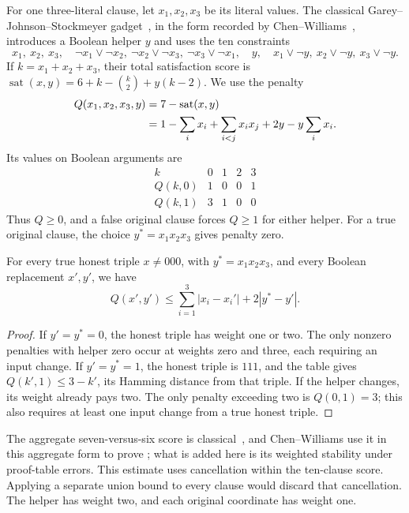 For one three-literal clause, let $x_1,x_2,x_3$ be its literal values.
The classical Garey--Johnson--Stockmeyer gadget~\cite{GJS76}, in
the form recorded by Chen--Williams~\cite[Lemma~47]{CW19}, introduces
a Boolean helper $y$ and uses the ten constraints
\[
 x_1,\ x_2,\ x_3,\quad
 \neg x_1\vee\neg x_2,\
 \neg x_2\vee\neg x_3,\
 \neg x_3\vee\neg x_1,\quad
 y,\quad x_1\vee\neg y,\ x_2\vee\neg y,\ x_3\vee\neg y.
\]
If $k=x_1+x_2+x_3$, their total satisfaction score is
$\operatorname{sat}(x,y)=6+k-\binom{k}{2}+y(k-2)$. We use the penalty
\begin{align}
 Q(x_1,x_2,x_3,y)
 &=7-\operatorname{sat}(x,y)\notag\\
 &=1-\sum_i x_i+\sum_{i<j}x_ix_j+2y-y\sum_i x_i.
 \label{earlier:g:eq:gadget-penalty}
\end{align}
Its values on Boolean arguments are
\[
\begin{array}{c|rrrr}
 k&0&1&2&3\\ \hline
 Q(k,0)&1&0&0&1\\
 Q(k,1)&3&1&0&0
\end{array}
\]
Thus $Q\ge0$, and a false original clause forces $Q\ge1$ for
either helper. For a true original clause, the choice
$y^*=x_1x_2x_3$ gives penalty zero.

\begin{lemma}
\label{earlier:g:lem:gadget-stability}
For every true honest triple $x\ne000$, with $y^*=x_1x_2x_3$, and
every Boolean replacement $x',y'$, we have
\[
 Q(x',y')\le\sum_{i=1}^3|x_i-x_i'|+2|y^*-y'|.
\]
\end{lemma}
\begin{proof}
If $y'=y^*=0$, the honest triple has weight one or two. The only
nonzero penalties with helper zero occur at weights zero and three,
each requiring an input change. If $y'=y^*=1$, the honest triple
is $111$, and the table gives $Q(k',1)\le3-k'$, its Hamming distance
from that triple. If the helper changes, its weight already pays two.
The only penalty exceeding two is $Q(0,1)=3$; this also requires at
least one input change from a true honest triple.
\end{proof}

The aggregate seven-versus-six score is classical~\cite{GJS76}, and
Chen--Williams use it in this aggregate form to prove
\cite[Lemma~25]{CW19}; what is added here is its weighted stability
under proof-table errors. This estimate uses cancellation within the
ten-clause score. Applying
a separate union bound to every clause would discard that cancellation.
The helper has weight two, and each original coordinate has weight one.


